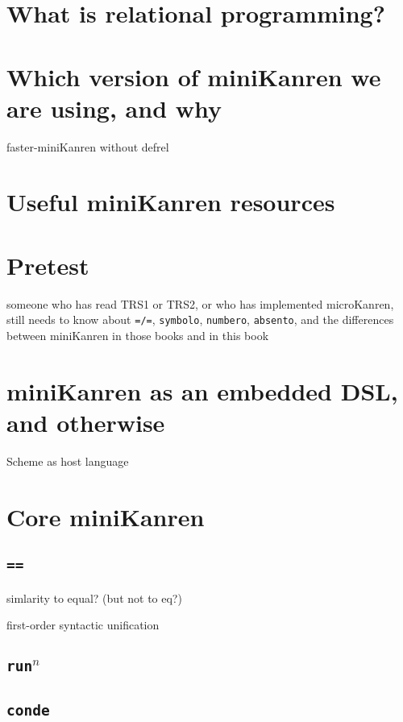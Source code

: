 \documentclass{book}
\begin{document}
\section{What is relational programming?}

\section{Which version of miniKanren we are using, and why}

faster-miniKanren without defrel

\section{Useful miniKanren resources}

\section{Pretest}

someone who has read TRS1 or TRS2, or who has implemented microKanren,
still needs to know about \texttt{=/=}, \texttt{symbolo},
\texttt{numbero}, \texttt{absento}, and the differences between
miniKanren in those books and in this book

\section{miniKanren as an embedded DSL, and otherwise}

Scheme as host language

\section{Core miniKanren}

\subsection{\texttt{==}}

simlarity to equal? (but not to eq?)

first-order syntactic unification

\subsection{\texttt{run}$^{n}$}

\subsection{\texttt{conde}}
\end{document}
